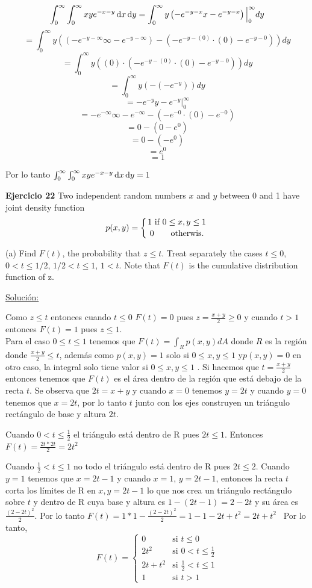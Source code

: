 \documentclass{report}
\newcommand{\s}{\underline{Soluci\'{o}n:}}
\begin{document}
	\[ \int_0^\infty\int_0^\infty xye^{-x-y} \, \text dx \, \text dy  
	  = \int_0^\infty y \left( -e^{-y-x}x-e^{-y-x}\right) \Big|_0^\infty dy\] 
	\[= \int_0^\infty y\left(\left( -e^{-y-\infty}\infty-e^{-y-\infty}\right)- 
		\left(-e^{-y-(0)}\cdot(0)-e^{-y-0}\right)\right)dy \]
	\[= \int_0^\infty y \left((0)\cdot \left( -e^{-y-(0)}\cdot(0)-e^{-y-0}\right)\right)dy\]
	\[= \int_0^\infty y \left(-\left( -e^{-y}\right)\right) dy\]
	\[= -e^{-y}y-e^{-y}\Big|_0^\infty\]
	\[= -e^{-\infty}\infty-e^{-\infty} -\left(-e^{-0}\cdot(0)-e^{-0} \right)  \]
	\[= 0 - \left(0-e^{0}\right)\]
	\[= 0 -\left(-e^{0}\right)\]
	\[= e^0 \]
	\[= 1\]
	
	Por lo tanto $\int_0^\infty\int_0^\infty xye^{-x-y} \, \text dx \, \text dy = 1$
	
	\textbf{Ejercicio 22}
	Two independent random numbers $x$ and $y$ between 0 and 1 have joint density function
	\[p(x,y) = \left\lbrace 
	 1 \, \,\text{if} \,\, 0 \leq x, y \leq 1 \atop 0 \qquad \text{otherwis}.
	\right. \]
	
	(a) Find $F(t)$, the probability that $z \leq t$. Treat separately
	the cases $t \leq 0$, $0 < t \leq 1/2$, $1/2 < t \leq 1$,
	$1 < t$. Note that $F(t)$ is the cumulative distribution
	function of z.
	
	\s 
	
	 Como $z \leq  t $ entonces cuando $t \leq 0$ $F(t) = 0$ pues $z=\frac{x+y}{2} \geq 0$ y cuando $t >1$ entonces $F(t)=1$ pues $z \leq 1$.
	\\
	Para el caso $0 \leq t \leq 1$ tenemos que $F(t)= \int_{R} p(x,y) dA$ donde $R$ es la región donde $\frac{x+y}{2} \leq t$, además como $p(x,y)=1$ solo si $0 \leq x, y\leq 1$ y$p(x,y)=0$ en otro caso, la integral solo tiene valor si $0 \leq x, y\leq 1$ .  Si hacemos que $t = \frac{x+y}{2}$ entonces tenemos que $F(t)$ es  el área dentro de la región que está debajo de la recta $t$. Se observa que $2t = x+y$ y cuando $x=0$ tenemos $y = 2t$ y cuando $y=0$ tenemos que $x = 2t$, por lo tanto $t$ junto con los ejes construyen un triángulo rectángulo de base y altura $2t$. 
	
	Cuando $0<t\leq \frac{1}{2}$ el triángulo está dentro de R pues $2t \leq 1$. Entonces $F(t) = \frac{2t*2t}{2}=2t^2$
	
	Cuando $\frac{1}{2} < t \leq 1$ no todo el triángulo está dentro de R pues $2t \leq 2$. Cuando $y=1$ tenemos que $x = 2t -1$ y cuando $x=1$, $y = 2t-1$, entonces la recta $t$ corta los límites de R en $x,y=2t-1$ lo que nos crea un triángulo rectángulo sobre $t$
	y dentro de R cuya base y altura es $1-(2t-1) = 2 - 2t$ y su área es $\frac{(2-2t)^2}{2}$. Por lo tanto $F(t) = 1*1 - \frac{(2-2t)^2}{2}=1-1-2t+t^2 =2t+t^2$
	\
	Por lo tanto, 
	\[
	F(t)=
	\begin{cases}
	0 & \text{si $t \leq 0$} \\
	2t^2 & \text{si $0<t\leq \frac{1}{2}$}\\
	2t+t^2 & \text{si $\frac{1}{2} < t \leq 1$}\\
	1 & \text{si $t>1$}
	\end{cases}
	\]
	
\end{document}
